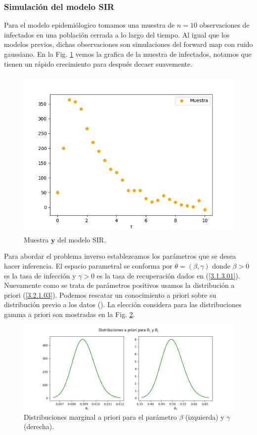 \subsubsection{Simulación del modelo SIR}

Para el modelo epidemiólogico tomamos una muestra de $n =10$ observaciones de infectados en una población cerrada a lo largo del tiempo. Al igual que los modelos previos, dichas observaciones son simulaciones del forward map con ruido gaussiano. En la Fig. \ref{Fig. SIR_01} vemos la grafica de la muestra de infectados, notamos que tienen un rápido crecimiento para después decaer suavemente.

\begin{figure}
    \centering 
    \includegraphics[width = 10 cm]{img/Exp_Central_SIR_sigma/Figuras/Generales/Muestra_SIR_sigma.png} 
    \caption{Muestra $\mathbf{y}$ del modelo SIR.}
    \label{Fig. SIR_01}
\end{figure} 

Para abordar el problema inverso establezcamos los parámetros que se desea hacer inferencia. El espacio parametral se conforma por $\theta = (\beta,\gamma)$ donde $\beta >0$ es la tasa de infección y $\gamma > 0$ es la tasa de recuperación dados en (\ref{3.1.3.01}). Nuevamente como se trata de parámetros positivos usamos la distribución a priori (\ref{3.2.1.03}). Podemos rescatar un conocimiento a priori sobre su distribución previo a los datos (\cite{weiss2013sir}). La elección considera para las distribuciones gamma a priori son mostradas en la Fig. \ref{Fig. SIR_02}.

\begin{figure}[H] 
    \centering 
    \includegraphics[width = 15 cm ]{img/Exp_Central_SIR_sigma/Figuras/Generales/Apriori_SIR_sigma.png} 
    \caption{Distribuciones marginal a priori para el parámetro $\beta$ (izquierda) y $\gamma$ (derecha).}
    \label{Fig. SIR_02}
\end{figure} 

